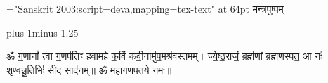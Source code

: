 \documentclass[twoside,12pt]{book}
\renewcommand{\chaptermark}[1]{%
\markboth{\large #1}{}}
\begin{document}
\thispagestyle{empty}\clearpage
\begin{titlepage}
    \vspace*{6.5cm}
    \begin{center}
        {\font\x="Sanskrit 2003:script=deva,mapping=tex-text" at 64pt \x मन्त्रपुष्पम्}
    \end{center}
\end{titlepage}

\clearemptydoublepage %
\setcounter{page}{0} %
\renewcommand{\chaptermark}[1]{%
    \markboth{\large #1}{}} %
\begin{large}
    \tableofcontents
\end{large}

\mbox{}
\clearpage
\thispagestyle{empty}
\clearemptydoublepage
\fontsize{18pt}{22pt}\selectfont
\font plus 1\font minus 1.25\font
\setlength{\parindent}{0pt}
\setlength{\emergencystretch}{3em}
\setcounter{page}{0}
\renewcommand{\chaptermark}[1]{%
    \markboth{\large #1}{}}
\fontsize{19pt}{23pt}\selectfont
\makeatletter
  \def\vhrulefill#1{\leavevmode\leaders\hrule\@height#1\hfill \kern\z@}
\makeatother
{}
\newcommand{\anuvakamend}[1][]{\refstepcounter{anuvakam}%
\newline\ifthenelse{\equal{#1}{}}{\mbox{}}{{\small #1॥}}\nolinebreak[4]\vhrulefill{2.5pt}\raisebox{-4pt}{\bfseries{[\devanumber{\arabic{anuvakam}}]}}%
}
\setlength{\emergencystretch}{3em}


ॐ ग॒णानां᳚ त्वा ग॒णप॑तिꣳ हवामहे क॒विं क॑वी॒ना\-मु॑प॒मश्र॑वस्तमम्। 
ज्ये॒ष्ठ॒राजं॒ ब्रह्म॑णां ब्रह्मणस्पत॒ आ नः॑ शृ॒ण्वन्नू॒तिभिः॑ सीद॒ साद॑नम्॥ 
ॐ महागणपतये॒ नमः॥ 


% 
 
 
\clearpage
 
\end{document}
